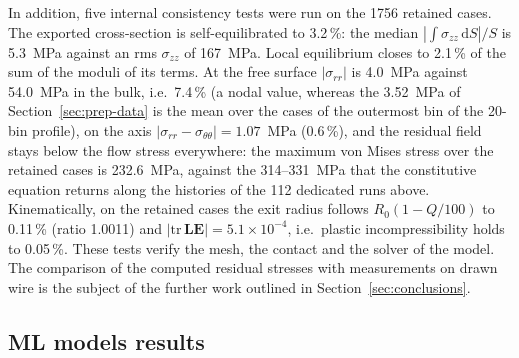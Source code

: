 \documentclass[pdflatex,sn-basic,Numbered]{sn-jnl}
\begin{document}
In addition, five internal consistency tests were run on the 1756 retained cases. The exported cross-section is self-equilibrated to 3.2\,\%: the median $|\int\sigma_{zz}\,\mathrm{d}S|/S$ is 5.3~MPa against an rms $\sigma_{zz}$ of 167~MPa.
Local equilibrium closes to 2.1\,\% of the sum of the moduli of its terms.
At the free surface $|\sigma_{rr}|$ is 4.0~MPa against 54.0~MPa in the bulk, i.e.\ 7.4\,\% (a nodal value, whereas the 3.52~MPa of Section~\ref{sec:prep-data} is the mean over the cases of the outermost bin of the 20-bin profile),
on the axis $|\sigma_{rr}-\sigma_{\theta\theta}| = 1.07$~MPa (0.6\,\%),
and the residual field stays below the flow stress everywhere: the maximum von Mises stress over the retained cases is 232.6~MPa, against the 314--331~MPa that the constitutive equation returns along the histories of the 112 dedicated runs above.
Kinematically, on the retained cases the exit radius follows $R_0(1-Q/100)$ to 0.11\,\% (ratio 1.0011) and $|\mathrm{tr}\,\mathbf{LE}| = 5.1\times10^{-4}$, i.e.\ plastic incompressibility holds to 0.05\,\%.
These tests verify the mesh, the contact and the solver of the model. The comparison of the computed residual stresses with measurements on drawn wire is the subject of the further work outlined in Section~\ref{sec:conclusions}.

\subsection{ML models results}
\label{sec:results}
\end{document}
